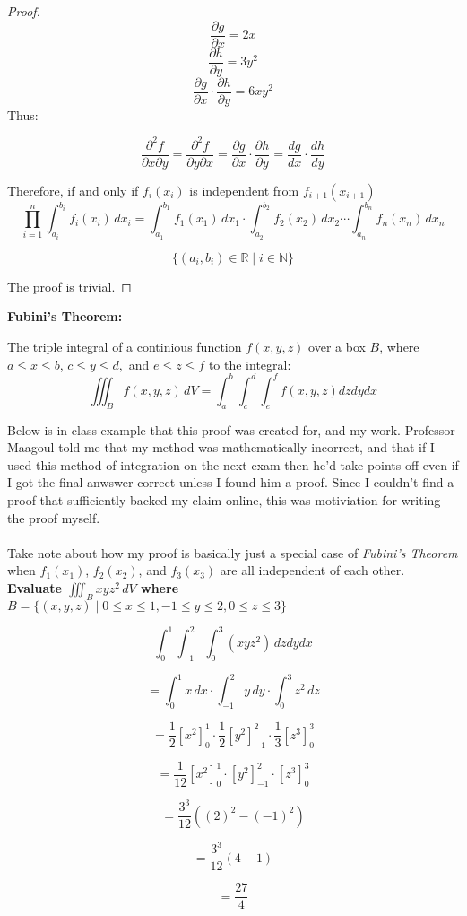 \documentclass{article}
\begin{document}
\begin{proof}
\[\frac{\partial g}{\partial x} = 2x\]
\[\frac{\partial h}{\partial y} = 3y^{2}\]
\[\frac{\partial g}{\partial x} \cdot \frac{\partial h}{\partial y} = 6xy^{2}\]
Thus:

\[
    \frac{\partial^2 f}{\partial x \partial y} = \frac{\partial^2 f}{\partial y \partial x} = \frac{\partial g}{\partial x} \cdot \frac{\partial h}{\partial y} = \frac{dg}{dx} \cdot \frac{dh}{dy}
\]

Therefore, if and only if $f_i(x_i)$ is independent from $f_{i+1}(x_{i+1})$
\[
\prod_{i=1}^n \int_{a_i}^{b_i} f_i(x_i) \, dx_i = \int_{a_1}^{b_1} f_1(x_1) \, dx_1 \cdot \int_{a_2}^{b_2} f_2(x_2) \, dx_2 \cdots \int_{a_n}^{b_n} f_n(x_n) \, dx_n
\]

\[
    \{(a_i, b_i) \in \mathbb{R}\mid i \in \mathbb{N} \}
\]

The proof is trivial.

\end{proof}

\newpage

\textbf{Fubini's Theorem:}

The triple integral of a continious function \( f(x, y, z) \) over a box \( B \), where $a \leq x \leq b$, $c \leq y \leq d,$ and $e \leq z \leq f$ to the integral:
\[
    \iiint_B f(x, y, z) \, dV = \int_{a}^{b} \int_{c}^{d} \int_{e}^{f}f(x,y,z)dzdydx
\]

Below is in-class example that this proof was created for, and my work. Professor Maagoul told me that my method was mathematically incorrect, and that if I used this method of integration on the next exam then he'd take points off even if I got the final anwswer correct unless I found him a proof. Since I couldn't find a proof that sufficiently backed my claim online, this was motiviation for writing the proof myself. \\\\
Take note about how my proof is basically just a special case of \textit{Fubini's Theorem} when  $f_1(x_1)$, $f_{2}(x_{2})$, and $f_{3}(x_{3})$ are all independent of each other.\\

\textbf{Evaluate $\iiint_B xyz^{2} \, dV$ where $ B = \{(x,y,z) \mid  0 \leq x \leq 1, -1 \leq y \leq 2, 0 \leq z \leq 3\}$}

\[
    \int_{0}^{1} \int_{-1}^{2} \int_{0}^{3}(xyz^{2}) \, dzdydx
\]

\[
    = \int_{0}^{1}x \, dx \cdot \int_{-1}^{2}y \, dy \cdot \int_{0}^{3}z^{2} \, dz
\]

\[
    = \frac{1}{2}[x^{2}]_{0}^{1} \cdot \frac{1}{2}[y^{2}]_{-1}^{2} \cdot \frac{1}{3}[z^{3}]_{0}^{3}
\]

\[
    = \frac{1}{12}[x^{2}]_{0}^{1} \cdot [y^{2}]_{-1}^{2} \cdot [z^{3}]_{0}^{3}
\]

\[
    = \frac{3^{3}}{12}((2)^{2}-(-1)^{2})
\]

\[
    = \frac{3^{3}}{12}(4-1)
\]


\[
    = \frac{27}{4}
\] 
\end{document}
